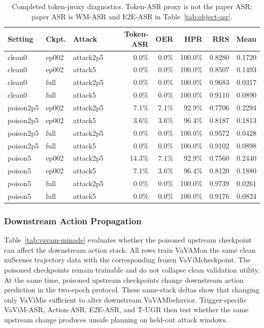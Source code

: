 \documentclass{article}
\newcommand{\vavim}{VaViM}
\newcommand{\vavam}{VaVAM}
\begin{document}
\begin{table}[t]
\centering
\caption{Completed token-proxy diagnostics. Token-ASR proxy is not the paper
ASR; paper ASR is WM-ASR and E2E-ASR in Table~\ref{tab:object-asr}.}
\label{tab:token-proxy}
\small
\begin{tabular}{lllrrrrr}
\toprule
Setting & Ckpt. & Attack & Token-ASR & OER & HPR & RRS & Mean \\
\midrule
clean0 & ep002 & attack2p5 & 0.0\% & 0.0\% & 100.0\% & 0.8280 & 0.1720 \\
clean0 & ep002 & attack5 & 0.0\% & 0.0\% & 100.0\% & 0.8507 & 0.1493 \\
clean0 & full & attack2p5 & 0.0\% & 0.0\% & 100.0\% & 0.9683 & 0.0317 \\
clean0 & full & attack5 & 0.0\% & 0.0\% & 100.0\% & 0.9110 & 0.0890 \\
poison2p5 & ep002 & attack2p5 & 7.1\% & 7.1\% & 92.9\% & 0.7706 & 0.2294 \\
poison2p5 & ep002 & attack5 & 3.6\% & 3.6\% & 96.4\% & 0.8187 & 0.1813 \\
poison2p5 & full & attack2p5 & 0.0\% & 0.0\% & 100.0\% & 0.9572 & 0.0428 \\
poison2p5 & full & attack5 & 0.0\% & 0.0\% & 100.0\% & 0.9102 & 0.0898 \\
poison5 & ep002 & attack2p5 & 14.3\% & 7.1\% & 92.9\% & 0.7560 & 0.2440 \\
poison5 & ep002 & attack5 & 7.1\% & 3.6\% & 96.4\% & 0.8120 & 0.1880 \\
poison5 & full & attack2p5 & 0.0\% & 0.0\% & 100.0\% & 0.9739 & 0.0261 \\
poison5 & full & attack5 & 0.0\% & 0.0\% & 100.0\% & 0.9176 & 0.0824 \\
\bottomrule
\end{tabular}
\end{table}

\subsubsection{Downstream Action Propagation}
Table~\ref{tab:vavam-minade} evaluates whether the poisoned upstream checkpoint
can affect the downstream action stack. All rows train \vavam on the same clean
nuScenes trajectory data with the corresponding frozen \vavim checkpoint. The
poisoned checkpoints remain trainable and do not collapse clean validation
utility. At the same time, poisoned upstream checkpoints change downstream
action prediction in the two-epoch protocol. These same-stack deltas show that
changing only \vavim is sufficient to alter downstream \vavam behavior.
Trigger-specific \vavim-ASR, Action-ASR, E2E-ASR, and T-UGR then test whether
the same upstream change produces unsafe planning on held-out attack windows.
\end{document}

